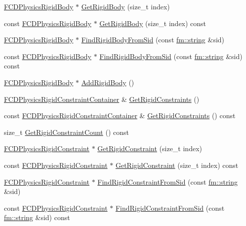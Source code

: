 \begin{DoxyCompactItemize}
\item 
\hyperlink{classFCDPhysicsRigidBody}{FCDPhysicsRigidBody} $\ast$ \hyperlink{classFCDPhysicsModel_a81a58aa2f1df8cf24197cc722ac8cac7}{GetRigidBody} (size\_\-t index)
\item 
const \hyperlink{classFCDPhysicsRigidBody}{FCDPhysicsRigidBody} $\ast$ \hyperlink{classFCDPhysicsModel_a6f48bfc2932d7dac65f11a82e5743627}{GetRigidBody} (size\_\-t index) const 
\item 
\hyperlink{classFCDPhysicsRigidBody}{FCDPhysicsRigidBody} $\ast$ \hyperlink{classFCDPhysicsModel_a956793477886604c0a19742047b0583a}{FindRigidBodyFromSid} (const \hyperlink{classfm_1_1stringT}{fm::string} \&sid)
\item 
const \hyperlink{classFCDPhysicsRigidBody}{FCDPhysicsRigidBody} $\ast$ \hyperlink{classFCDPhysicsModel_a5d78f6bd24271ae8620e2ef12f50117d}{FindRigidBodyFromSid} (const \hyperlink{classfm_1_1stringT}{fm::string} \&sid) const 
\item 
\hyperlink{classFCDPhysicsRigidBody}{FCDPhysicsRigidBody} $\ast$ \hyperlink{classFCDPhysicsModel_a4f24faaa9cee06ad6a148eb45572c496}{AddRigidBody} ()
\item 
\hyperlink{classFUObjectContainer}{FCDPhysicsRigidConstraintContainer} \& \hyperlink{classFCDPhysicsModel_af2cee3570b90eafa0d84a00c827273d1}{GetRigidConstraints} ()
\item 
const \hyperlink{classFUObjectContainer}{FCDPhysicsRigidConstraintContainer} \& \hyperlink{classFCDPhysicsModel_a0651e65e0820fcc89d6691cf0f1f36fd}{GetRigidConstraints} () const 
\item 
size\_\-t \hyperlink{classFCDPhysicsModel_a8b0483d5e5507540ceabb40951ae147e}{GetRigidConstraintCount} () const 
\item 
\hyperlink{classFCDPhysicsRigidConstraint}{FCDPhysicsRigidConstraint} $\ast$ \hyperlink{classFCDPhysicsModel_aaa881246071f32aeca94c78ccf12b7be}{GetRigidConstraint} (size\_\-t index)
\item 
const \hyperlink{classFCDPhysicsRigidConstraint}{FCDPhysicsRigidConstraint} $\ast$ \hyperlink{classFCDPhysicsModel_a16ee7e602747d4e6d603dde97fb63fe4}{GetRigidConstraint} (size\_\-t index) const 
\item 
\hyperlink{classFCDPhysicsRigidConstraint}{FCDPhysicsRigidConstraint} $\ast$ \hyperlink{classFCDPhysicsModel_a6ebc6f8ce35c796c9509da44ca113eaf}{FindRigidConstraintFromSid} (const \hyperlink{classfm_1_1stringT}{fm::string} \&sid)
\item 
const \hyperlink{classFCDPhysicsRigidConstraint}{FCDPhysicsRigidConstraint} $\ast$ \hyperlink{classFCDPhysicsModel_a6e9b3f4400aec64c3645a115c5dfe013}{FindRigidConstraintFromSid} (const \hyperlink{classfm_1_1stringT}{fm::string} \&sid) const 

\end{DoxyCompactItemize}
